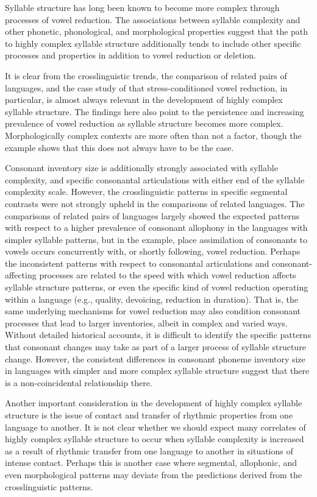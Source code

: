   Syllable structure has long been known to become more complex through processes of vowel reduction. The associations between syllable complexity and other phonetic, phonological, and morphological properties suggest that the path to highly complex syllable structure additionally tends to include other specific processes and properties in addition to vowel reduction or deletion.

  It is clear from the crosslinguistic trends, the comparison of related pairs of languages, and the case study of  that stress-conditioned vowel reduction, in particular, is almost always relevant in the development of highly complex syllable structure. The findings here also point to the persistence and increasing prevalence of vowel reduction as syllable structure becomes more complex. Morphologically complex contexts are more often than not a factor, though the  example shows that this does not always have to be the case.

  Consonant inventory size is additionally strongly associated with syllable complexity, and specific consonantal articulations with either end of the syllable complexity scale. However, the crosslinguistic patterns in specific segmental contrasts were not strongly upheld in the comparisons of related languages. The comparisons of related pairs of languages largely showed the expected patterns with respect to a higher prevalence of consonant allophony in the languages with simpler syllable patterns, but in the  example, place assimilation of consonants to vowels occurs concurrently with, or shortly following, vowel reduction. Perhaps the inconsistent patterns with respect to consonantal articulations and consonant-affecting processes are related to the speed with which vowel reduction affects syllable structure patterns, or even the specific kind of vowel reduction operating within a language (e.g., quality, devoicing, reduction in duration). That is, the same underlying mechanisms for vowel reduction may also condition consonant processes that lead to larger inventories, albeit in complex and varied ways. Without detailed historical accounts, it is difficult to identify the specific patterns that consonant changes may take as part of a larger process of syllable structure change. However, the consistent differences in consonant phoneme inventory size in languages with simpler and more complex syllable structure suggest that there is a non-coincidental relationship there.

  Another important consideration in the development of highly complex syllable structure is the issue of contact and transfer of rhythmic properties from one language to another. It is not clear whether we should expect many correlates of highly complex syllable structure to occur when syllable complexity is increased as a result of rhythmic transfer from one language to another in situations of intense contact. Perhaps this is another case where segmental, allophonic, and even morphological patterns may deviate from the predictions derived from the crosslinguistic patterns.

